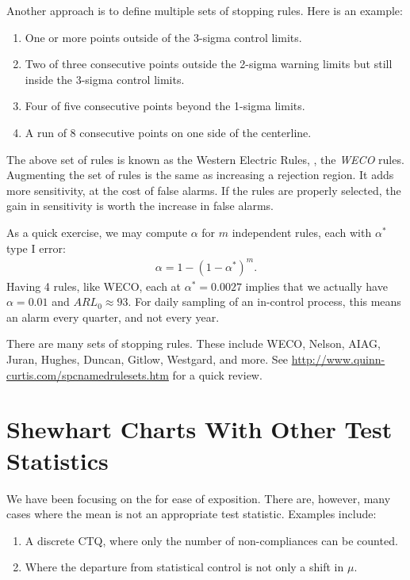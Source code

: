 Another approach is to define multiple sets of stopping rules.
Here is an example:
\begin{enumerate}
\item One or more points outside of the 3-sigma control limits.
\item Two of three consecutive points outside the 2-sigma warning limits but still inside the 3-sigma control limits.
\item Four of five consecutive points beyond the 1-sigma limits.
\item A run of 8 consecutive points on one side of the centerline.
\end{enumerate}
The above set of rules is known as the Western Electric Rules, \aka, the \emph{WECO} rules.
Augmenting the set of rules is the same as increasing a rejection region. It adds more sensitivity, at the cost of false alarms. If the rules are properly selected, the gain in sensitivity is worth the increase in false alarms.

As a quick exercise, we may compute $\alpha$  for $m$ independent rules, each with $\alpha^*$ type I error:
\begin{align}
\label{eq:multiplicity_in_spc}
	\alpha=1-(1-\alpha^*)^m.
\end{align}
Having 4 rules, like WECO, each at $\alpha^*=0.0027$ implies that we actually have $\alpha=0.01$ and $ARL_0 \approx 93$. For daily sampling of an in-control process, this means an alarm every quarter, and not every year. 

\begin{extra}
There are many sets of stopping rules. 
These include WECO, Nelson, AIAG, Juran, Hughes, Duncan, Gitlow, Westgard, and more. 
See \url{http://www.quinn-curtis.com/spcnamedrulesets.htm} for a quick review.
\end{extra}







\section{Shewhart Charts With Other Test Statistics}

We have been focusing on the \barxChart for ease of exposition. There are, however, many cases where the mean is not an appropriate test statistic.
Examples include:
\begin{enumerate}
\item A discrete CTQ, where only the number of non-compliances can be counted. 
\item Where the departure from statistical control is not only a shift in $\mu$.
\end{enumerate}

